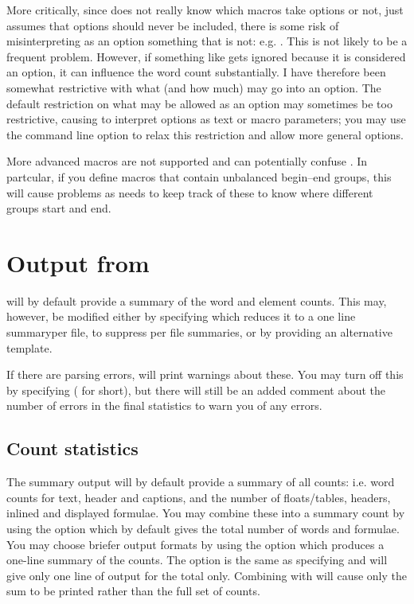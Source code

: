 \documentclass{article}
\begin{document}
More critically, since \TeXcount{} does not really know which macros take options or not, just assumes that options should never be included, there is some risk of misinterpreting as an option something that is not: e.g. . This is not likely to be a frequent problem. However, if something like  gets ignored because it is considered an option, it can influence the word count substantially. I have therefore been somewhat restrictive with what (and how much) may go into an option. The default restriction on what may be allowed as an option may sometimes be too restrictive, causing \TeXcount{} to interpret options as text or macro parameters; you may use the command line option  to relax this restriction and allow more general options.

More advanced macros are not supported and can potentially confuse \TeXcount{}. In partcular, if you define macros that contain unbalanced begin--end groups, this will cause problems as \TeXcount{} needs to keep track of these to know where different groups start and end.


\section{Output from \TeXcount{}}

\TeXcount{} will by default provide a summary of the word and element counts. This may, however, be modified either by specifying  which reduces it to a one line summaryper file,  to suppress per file summaries, or by providing an alternative template.

If there are parsing errors, \TeXcount{} will print warnings about these. You may turn off this by specifying  ( for short), but there will still be an added comment about the number of errors in the final statistics to warn you of any errors.

\subsection{Count statistics}

The summary output will by default provide a summary of all counts: i.e. word counts for text, header and captions, and the number of floats/tables, headers, inlined and displayed formulae. You may combine these into a summary count by using the  option which by default gives the total number of words and formulae. You may choose briefer output formats by using the  option which produces a one-line summary of the counts. The option  is the same as specifying  and will give only one line of output for the total only. Combining  with  will cause only the sum to be printed rather than the full set of counts.
\end{document}
